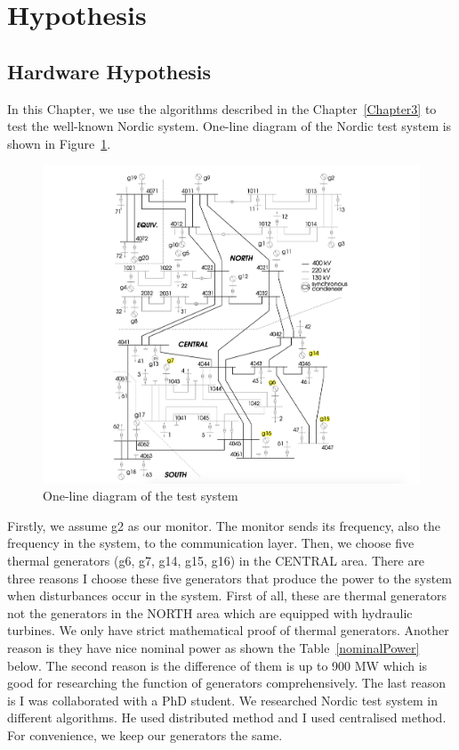 \section{Hypothesis} %
\label{section4.1}
\subsection{Hardware Hypothesis} %
\label{subsection4.1.1}

In this Chapter, we use the algorithms described in the Chapter~\ref{Chapter3} to test the well-known Nordic system. One-line diagram of the Nordic test system is  shown in Figure~\ref{4_1_1_nordic}. 

\begin{figure}[htbp]
\centering
\includegraphics[width = .891\textwidth]{figure/4_1_1_nordic.png}
\caption{One-line diagram of the test system}
\label{4_1_1_nordic}
\end{figure}

Firstly, we assume g2 as our monitor. The monitor sends its frequency, also the frequency in the system, to the communication layer. Then, we choose five thermal generators  (g6, g7, g14, g15, g16) in the CENTRAL area. There are three reasons I choose these five generators that produce the power to the system when disturbances occur in the system. First of all, these are thermal generators not the generators in the NORTH area which are equipped with hydraulic turbines. We only have strict mathematical proof of thermal generators. Another reason is they have nice nominal power as shown the Table~\ref{nominalPower} below. The second reason is the difference of them is up to 900 MW which is good for researching the function of generators comprehensively. The last reason is I was collaborated with a PhD student. We researched Nordic test system in different algorithms. He used distributed method and I used centralised method. For convenience, we keep our generators the same. 


